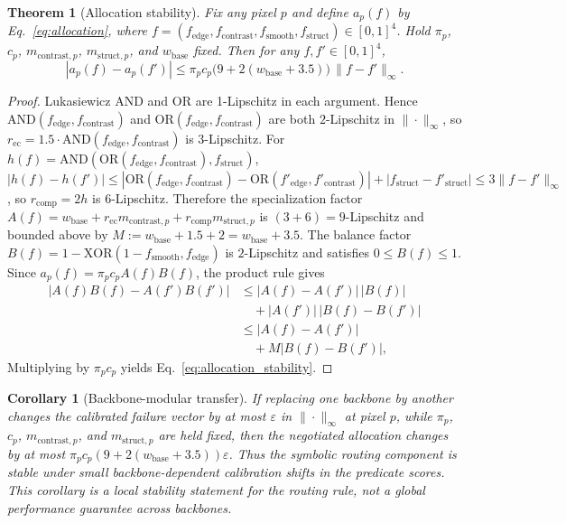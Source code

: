 \documentclass{ieeetj}
\newtheorem{theorem}{Theorem}
\newtheorem{corollary}{Corollary}
\begin{document}
\begin{theorem}[Allocation stability]
\label{thm:allocation_stability}
Fix any pixel $p$ and define $a_p(f)$ by Eq.~\eqref{eq:allocation}, where $f=(f_\text{edge},f_\text{contrast},f_\text{smooth},f_\text{struct})\in[0,1]^4$. Hold $\pi_p$, $c_p$, $m_{\text{contrast},p}$, $m_{\text{struct},p}$, and $w_\text{base}$ fixed. Then for any $f,f'\in[0,1]^4$,
\begin{equation}
|a_p(f)-a_p(f')| \le \pi_p c_p \bigl(9 + 2(w_\text{base}+3.5)\bigr)\,\|f-f'\|_\infty.
\label{eq:allocation_stability}
\end{equation}
\end{theorem}
\begin{proof}
Lukasiewicz AND and OR are 1-Lipschitz in each argument. Hence
$\text{AND}(f_\text{edge},f_\text{contrast})$ and
$\text{OR}(f_\text{edge},f_\text{contrast})$ are both $2$-Lipschitz in $\|\cdot\|_\infty$, so
$r_\text{ec}=1.5\cdot \text{AND}(f_\text{edge},f_\text{contrast})$ is $3$-Lipschitz. For
$h(f)=\text{AND}(\text{OR}(f_\text{edge},f_\text{contrast}),f_\text{struct})$,
$|h(f)-h(f')|
\le |\text{OR}(f_\text{edge},f_\text{contrast})-\text{OR}(f'_\text{edge},f'_\text{contrast})|
+ |f_\text{struct}-f'_\text{struct}|
\le 3\|f-f'\|_\infty$,
so $r_\text{comp}=2h$ is $6$-Lipschitz. Therefore the specialization factor
$A(f)=w_\text{base}+r_\text{ec}m_{\text{contrast},p}+r_\text{comp}m_{\text{struct},p}$
is $(3+6)=9$-Lipschitz and bounded above by
$M:=w_\text{base}+1.5+2=w_\text{base}+3.5$.
The balance factor $B(f)=1-\text{XOR}(1-f_\text{smooth},f_\text{edge})$ is $2$-Lipschitz and satisfies $0\le B(f)\le 1$.
Since $a_p(f)=\pi_p c_p A(f)B(f)$, the product rule gives
\begin{align*}
|A(f)B(f)-A(f')B(f')|
&\le |A(f)-A(f')|\,|B(f)| \\
&\quad + |A(f')|\,|B(f)-B(f')| \\
&\le |A(f)-A(f')| \\
&\quad + M|B(f)-B(f')|,
\end{align*}
Multiplying by $\pi_pc_p$ yields Eq.~\eqref{eq:allocation_stability}.
\end{proof}

\begin{corollary}[Backbone-modular transfer]
If replacing one backbone by another changes the calibrated failure vector by at most $\varepsilon$ in $\|\cdot\|_\infty$ at pixel $p$, while $\pi_p$, $c_p$, $m_{\text{contrast},p}$, and $m_{\text{struct},p}$ are held fixed, then the negotiated allocation changes by at most $\pi_p c_p (9+2(w_\text{base}+3.5))\varepsilon$. Thus the symbolic routing component is stable under small backbone-dependent calibration shifts in the predicate scores. This corollary is a local stability statement for the routing rule, not a global performance guarantee across backbones.
\end{corollary}
\end{document}

